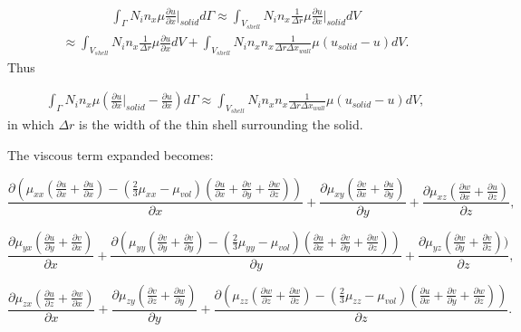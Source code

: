 \begin{eqnarray}
\int_\Gamma  N_i n_x \mu \frac{\partial u}{\partial x} \vert_{solid} d\Gamma
\approx 
\int_{V_{shell}}  N_i n_x \frac{1}{\Delta r} \mu \frac{\partial u}{\partial x} \vert_{solid}  dV
\label{visc-stress-original-practical-a} 
\end{eqnarray} 
\begin{eqnarray}
\approx
\int_{V_{shell}}  N_i n_x \frac{1}{\Delta r}\mu \frac{\partial u}{\partial x}  dV
+
\int_{V_{shell}}  N_i n_x n_x \frac{1}{\Delta r \Delta x_{wall}}\mu (u_{solid} -u)  dV.
\label{visc-stress-original-practical} 
\end{eqnarray} 
Thus

\begin{eqnarray}
\int_\Gamma N_i n_x \mu ( \frac{\partial u}{\partial x}\vert_{solid} - \frac{\partial u}{\partial x} ) d\Gamma
\approx
\int_{V_{shell}}  N_i n_x n_x \frac{1}{\Delta r \Delta x_{wall} }\mu (u_{solid} -u)  dV, 
\end{eqnarray} 
in which $\Delta r$ is the width of the thin shell surrounding the solid. 


The viscous term expanded becomes:

\begin{equation}
\frac{\partial ( \mu_{xx}
(
\frac{\partial u}{\partial x}+\frac{\partial u}{\partial x})
-(\frac{2}{3}\mu_{xx}-\mu_{vol})(\frac{\partial u}{\partial x}+\frac{\partial v}{\partial y}+\frac{\partial w}{\partial z})
)}
{\partial x}
+
\frac{\partial \mu_{xy}
(
\frac{\partial v}{\partial x}+\frac{\partial u}{\partial y})
}
{\partial y}
+
\frac{\partial \mu_{xz}
(
\frac{\partial w}{\partial x}+\frac{\partial u}{\partial z})
}
{\partial z}, 
\label{visc-stress-u-2} 
\end{equation}



\begin{equation}
\frac{\partial \mu_{yx}
(
\frac{\partial u}{\partial y}+\frac{\partial v}{\partial x}
)}
{\partial x}
+
\frac{\partial (\mu_{yy}
(
\frac{\partial v}{\partial y}+\frac{\partial v}{\partial y})
-(\frac{2}{3}\mu_{yy}-\mu_{vol})(\frac{\partial u}{\partial x}+\frac{\partial v}{\partial y}+\frac{\partial w}{\partial z})
)}
{\partial y}
+
\frac{\partial \mu_{yz}
(
\frac{\partial w}{\partial y}+\frac{\partial v}{\partial z})
)}
{\partial z}, 
\label{visc-stress-v-2} 
\end{equation}



\begin{equation}
\frac{\partial \mu_{zx}
(
\frac{\partial u}{\partial z}+\frac{\partial w}{\partial x})
}
{\partial x}
+
\frac{\partial \mu_{zy}
(
\frac{\partial v}{\partial z}+\frac{\partial w}{\partial y})
}
{\partial y}
+
\frac{\partial ( \mu_{zz}
(
\frac{\partial w}{\partial z}+\frac{\partial w}{\partial z})
-(\frac{2}{3}\mu_{zz}-\mu_{vol})(\frac{\partial u}{\partial x}+\frac{\partial v}{\partial y}+\frac{\partial w}{\partial z})
)}
{\partial z}. 
\label{visc-stress-w-2} 
\end{equation}


